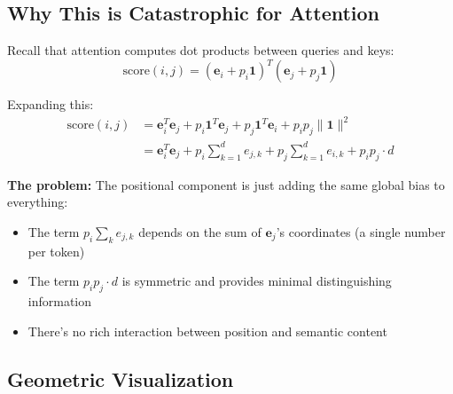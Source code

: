 \documentclass{article}
\begin{document}
\subsection{Why This is Catastrophic for Attention}

Recall that attention computes dot products between queries and keys:
\[
\text{score}(i, j) = (\mathbf{e}_i + p_i \mathbf{1})^T (\mathbf{e}_j + p_j \mathbf{1})
\]

Expanding this:
\begin{align}
\text{score}(i, j) &= \mathbf{e}_i^T \mathbf{e}_j + p_i \mathbf{1}^T \mathbf{e}_j + p_j \mathbf{1}^T \mathbf{e}_i + p_i p_j \|\mathbf{1}\|^2 \\
&= \mathbf{e}_i^T \mathbf{e}_j + p_i \sum_{k=1}^d e_{j,k} + p_j \sum_{k=1}^d e_{i,k} + p_i p_j \cdot d
\end{align}

\textbf{The problem:} The positional component is just adding the same global bias to everything:
\begin{itemize}
\item The term $p_i \sum_{k} e_{j,k}$ depends on the sum of ${\mathbf{e}_j}$'s coordinates (a single number per token)
\item The term $p_i p_j \cdot d$ is symmetric and provides minimal distinguishing information
\item There's no rich interaction between position and semantic content
\end{itemize}

\subsection{Geometric Visualization}
\end{document}
